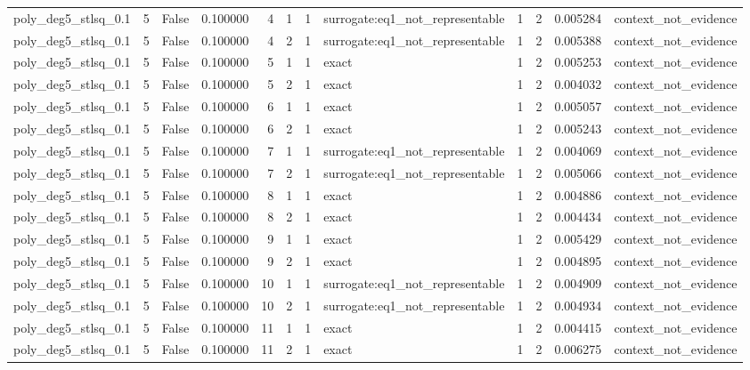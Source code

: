 \begin{tabular}{lrrrrrrlrrrl}
poly\_deg5\_stlsq\_0.1 & 5 & False & 0.100000 & 4 & 1 & 1 & surrogate:eq1\_not\_representable & 1 & 2 & 0.005284 & context\_not\_evidence \\
poly\_deg5\_stlsq\_0.1 & 5 & False & 0.100000 & 4 & 2 & 1 & surrogate:eq1\_not\_representable & 1 & 2 & 0.005388 & context\_not\_evidence \\
poly\_deg5\_stlsq\_0.1 & 5 & False & 0.100000 & 5 & 1 & 1 & exact & 1 & 2 & 0.005253 & context\_not\_evidence \\
poly\_deg5\_stlsq\_0.1 & 5 & False & 0.100000 & 5 & 2 & 1 & exact & 1 & 2 & 0.004032 & context\_not\_evidence \\
poly\_deg5\_stlsq\_0.1 & 5 & False & 0.100000 & 6 & 1 & 1 & exact & 1 & 2 & 0.005057 & context\_not\_evidence \\
poly\_deg5\_stlsq\_0.1 & 5 & False & 0.100000 & 6 & 2 & 1 & exact & 1 & 2 & 0.005243 & context\_not\_evidence \\
poly\_deg5\_stlsq\_0.1 & 5 & False & 0.100000 & 7 & 1 & 1 & surrogate:eq1\_not\_representable & 1 & 2 & 0.004069 & context\_not\_evidence \\
poly\_deg5\_stlsq\_0.1 & 5 & False & 0.100000 & 7 & 2 & 1 & surrogate:eq1\_not\_representable & 1 & 2 & 0.005066 & context\_not\_evidence \\
poly\_deg5\_stlsq\_0.1 & 5 & False & 0.100000 & 8 & 1 & 1 & exact & 1 & 2 & 0.004886 & context\_not\_evidence \\
poly\_deg5\_stlsq\_0.1 & 5 & False & 0.100000 & 8 & 2 & 1 & exact & 1 & 2 & 0.004434 & context\_not\_evidence \\
poly\_deg5\_stlsq\_0.1 & 5 & False & 0.100000 & 9 & 1 & 1 & exact & 1 & 2 & 0.005429 & context\_not\_evidence \\
poly\_deg5\_stlsq\_0.1 & 5 & False & 0.100000 & 9 & 2 & 1 & exact & 1 & 2 & 0.004895 & context\_not\_evidence \\
poly\_deg5\_stlsq\_0.1 & 5 & False & 0.100000 & 10 & 1 & 1 & surrogate:eq1\_not\_representable & 1 & 2 & 0.004909 & context\_not\_evidence \\
poly\_deg5\_stlsq\_0.1 & 5 & False & 0.100000 & 10 & 2 & 1 & surrogate:eq1\_not\_representable & 1 & 2 & 0.004934 & context\_not\_evidence \\
poly\_deg5\_stlsq\_0.1 & 5 & False & 0.100000 & 11 & 1 & 1 & exact & 1 & 2 & 0.004415 & context\_not\_evidence \\
poly\_deg5\_stlsq\_0.1 & 5 & False & 0.100000 & 11 & 2 & 1 & exact & 1 & 2 & 0.006275 & context\_not\_evidence \\

\end{tabular}
